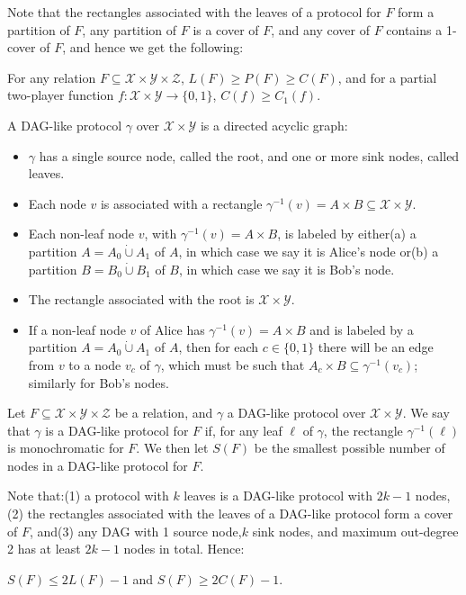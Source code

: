 Note that the rectangles associated with the leaves of a protocol for $F$ form a partition of $F$, any partition of $F$ is a cover of $F$, and any cover of $F$ contains a 1-cover of $F$, and hence we get the following:
\begin{ntlemma}
For any relation $F\subseteq\mathcal X\times\mathcal Y\times\mathcal Z$, $L(F)\geq P(F)\geq C(F)$, and for a partial two-player function $f:\mathcal X\times\mathcal Y\to\{0,1\}$, $C(f)\geq C_1(f)$.
\end{ntlemma}
\begin{ntdefinition}
A DAG-like protocol $\gamma$ over $\mathcal X\times\mathcal Y$ is a directed acyclic graph:
\begin{itemize}
\item $\gamma$ has a single source node, called the root, and one or more sink nodes, called leaves.
\item Each node $v$ is associated with a rectangle $\gamma^{-1}(v)=A\times B\subseteq\mathcal X\times\mathcal Y$.
\item Each non-leaf node $v$, with $\gamma^{-1}(v)=A\times B$, is labeled by either(a) a partition $A=A_0\mathbin{\dot\cup}A_1$ of $A$, in which case we say it is Alice's node or(b) a partition $B=B_0\mathbin{\dot\cup}B_1$ of $B$, in which case we say it is Bob's node.
\item The rectangle associated with the root is $\mathcal X\times\mathcal Y$.
\item If a non-leaf node $v$ of Alice has $\gamma^{-1}(v)=A\times B$ and is labeled by a partition $A=A_0\mathbin{\dot\cup}A_1$ of $A$, then for each $c\in\{0,1\}$ there will be an edge from $v$ to a node $v_c$ of $\gamma$, which must be such that $A_c\times B\subseteq\gamma^{-1}(v_c)$; similarly for Bob's nodes.
\end{itemize}
\end{ntdefinition}
\begin{ntdefinition}
Let $F\subseteq\mathcal X\times\mathcal Y\times\mathcal Z$ be a relation, and $\gamma$ a DAG-like protocol over $\mathcal X\times\mathcal Y$. We say that $\gamma$ is a DAG-like protocol for $F$ if, for any leaf $\ell$ of $\gamma$, the rectangle $\gamma^{-1}(\ell)$ is monochromatic for $F$. We then let $S(F)$ be the smallest possible number of nodes in a DAG-like protocol for $F$.
\end{ntdefinition}
Note that:(1) a protocol with $k$ leaves is a DAG-like protocol with $2k-1$ nodes,(2) the rectangles associated with the leaves of a DAG-like protocol form a cover of $F$, and(3) any DAG with 1 source node,$k$ sink nodes, and maximum out-degree 2 has at least $2k-1$ nodes in total. Hence:
\begin{ntlemma}
$S(F)\leq2L(F)-1$ and $S(F)\geq2C(F)-1$.
\end{ntlemma}
